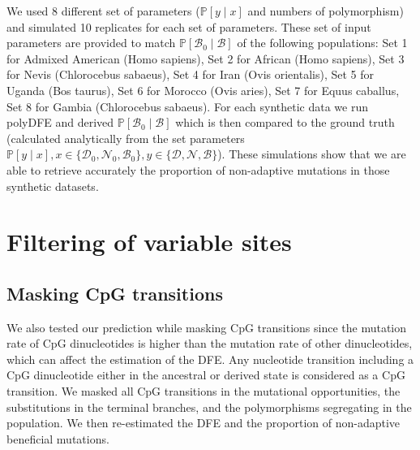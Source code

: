 \documentclass{article}
\newcommand{\proba}{\mathbb{P}}
\newcommand{\SphyDel}{\mathcal{D}_0}
\newcommand{\SphyNeu}{\mathcal{N}_0}
\newcommand{\SphyBen}{\mathcal{B}_0}
\newcommand{\given}{\mid}
\newcommand{\SpopDel}{\mathcal{D}}
\newcommand{\SpopNeu}{\mathcal{N}}
\newcommand{\SpopBen}{\mathcal{B}}
\begin{document}
    We used 8 different set of parameters ($\proba [y \given x]$ and numbers of polymorphism) and simulated 10 replicates for each set of parameters.
    These set of input parameters are provided to match $\proba [\SphyBen \given \SpopBen]$ of the following populations: Set 1 for Admixed American (Homo sapiens), Set 2 for African (Homo sapiens), Set 3 for Nevis (Chlorocebus sabaeus), Set 4 for Iran (Ovis orientalis), Set 5 for Uganda (Bos taurus), Set 6 for Morocco (Ovis aries), Set 7 for Equus caballus, Set 8 for Gambia (Chlorocebus sabaeus).
    For each synthetic data we run polyDFE and derived $\proba [\SphyBen \given \SpopBen]$ which is then compared to the ground truth (calculated analytically from the set parameters $\proba [y \given x], x \in \{ \SphyDel, \SphyNeu, \SphyBen \}, y \in \{ \SpopDel, \SpopNeu, \SpopBen \}$).
    These simulations show that we are able to retrieve accurately the proportion of non-adaptive mutations in those synthetic datasets.

    \newpage

    \section{Filtering of variable sites}

    \subsection{Masking CpG transitions}
    We also tested our prediction while masking CpG transitions since the mutation rate of CpG dinucleotides is higher than the mutation rate of other dinucleotides, which can affect the estimation of the DFE.
    Any nucleotide transition including a CpG dinucleotide either in the ancestral or derived state is considered as a CpG transition.
    We masked all CpG transitions in the mutational opportunities, the substitutions in the terminal branches, and the polymorphisms segregating in the population. We then re-estimated the DFE and the proportion of non-adaptive beneficial mutations.
\end{document}
